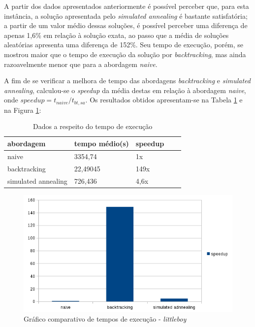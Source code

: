 \documentclass[a4paper, 12pt]{article}
\begin{document}
A partir dos dados apresentados anteriormente é possível perceber que, para esta instância, a solução apresentada pelo \textit{simulated annealing} é bastante satisfatória; a partir de um valor médio dessas soluções, é possível perceber uma diferença de apenas 1,6\% em relação à solução exata, ao passo que a média de soluções aleatórias apresenta uma diferença de 
152\%. Seu tempo de execução, porém, se mostrou maior que o tempo de execução da solução por \textit{backtracking}, mas ainda razoavelmente menor que para a abordagem \textit{naive}.

	A fim de se verificar a melhora de tempo das abordagens \textit{backtracking} e \textit{simulated annealing}, calculou-se o \textit{speedup} da média destas em relação à abordagem \textit{naive}, onde $speedup = t_{naive}/t_{bt,sa}$. Os resultados obtidos apresentam-se na Tabela \ref{tab:spdup} e na Figura \ref{fig:speedup}:
    
 \begin{table}[H]
\centering
\begin{tabular}{| l | l | l | l | l}
\hline
\textbf{abordagem} & \textbf{tempo médio(s)} & \textbf{speedup} \\\hline
naive & 3354,74 & 1x \\\hline
backtracking & 22,49045 & 149x \\\hline
simulated annealing & 726,436 & 4,6x \\\hline
\end{tabular}
\caption{\label{tab:spdup} Dados a respeito do tempo de execução}
\end{table}

\begin{figure}[!htbp]
	\centering
	\includegraphics{figures/graph7.png}
	\caption{\label{fig:speedup}Gráfico comparativo de tempos de execução - \textit{littleboy}}
\end{figure}
\end{document}
